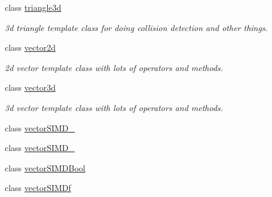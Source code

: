 \begin{DoxyCompactItemize}
class \hyperlink{classirr_1_1core_1_1triangle3d}{triangle3d}
\begin{DoxyCompactList}\small\item\em 3d triangle template class for doing collision detection and other things. \end{DoxyCompactList}\item 
class \hyperlink{classirr_1_1core_1_1vector2d}{vector2d}
\begin{DoxyCompactList}\small\item\em 2d vector template class with lots of operators and methods. \end{DoxyCompactList}\item 
class \hyperlink{classirr_1_1core_1_1vector3d}{vector3d}
\begin{DoxyCompactList}\small\item\em 3d vector template class with lots of operators and methods. \end{DoxyCompactList}\item 
class \hyperlink{classirr_1_1core_1_1vectorSIMD__16}{vector\+S\+I\+M\+D\+\_}
\item 
class \hyperlink{classirr_1_1core_1_1vectorSIMD__32}{vector\+S\+I\+M\+D\+\_}
\item 
class \hyperlink{classirr_1_1core_1_1vectorSIMDBool}{vector\+S\+I\+M\+D\+Bool}
\item 
class \hyperlink{classirr_1_1core_1_1vectorSIMDf}{vector\+S\+I\+M\+Df}
\end{DoxyCompactItemize}
